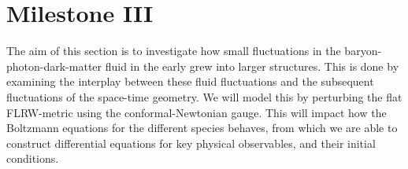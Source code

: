 \section{Milestone III}\label{sec:m3}

The aim of this section is to investigate how small fluctuations in the baryon-photon-dark-matter fluid in the early grew into larger structures. This is done by examining the interplay between these fluid fluctuations and the subsequent fluctuations of the space-time geometry. We will model this by perturbing the flat FLRW-metric using the conformal-Newtonian gauge. This will impact how the Boltzmann equations for the different species behaves, from which we are able to construct differential equations for key physical observables, and their initial conditions. 



